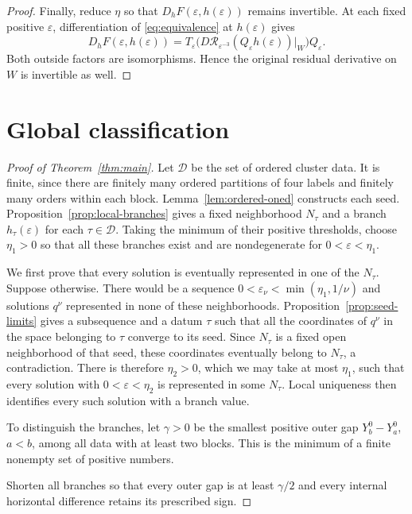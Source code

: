 \documentclass[11pt,a4paper]{amsart}
\numberwithin{equation}{section}
\newcommand{\eps}{\varepsilon}
\newcommand{\cR}{\mathcal R}
\newcommand{\cD}{\mathcal D}
\begin{document}
\begin{proof}
Finally, reduce $\eta$ so that $D_hF(\eps,h(\eps))$ remains invertible.
At each fixed positive $\eps$, differentiation of \eqref{eq:equivalence}
at $h(\eps)$ gives
\begin{equation}\label{eq:original-nondegeneracy}
 D_hF(\eps,h(\eps))
 =T_\eps\bigl(D\cR_{\eps^{-3}}(Q_\eps h(\eps))|_W\bigr)Q_\eps.
\end{equation}
Both outside factors are isomorphisms. Hence the original residual
derivative on $W$ is invertible as well.
\end{proof}

\section{Global classification}\label{sec:global}

\begin{proof}[Proof of Theorem~\ref{thm:main}]
Let $\cD$ be the set of ordered cluster data. It is finite, since there
are finitely many ordered partitions of four labels and finitely many
orders within each block. Lemma~\ref{lem:ordered-oned} constructs each
seed. Proposition~\ref{prop:local-branches} gives a fixed neighborhood
$N_\tau$ and a branch $h_\tau(\eps)$ for each $\tau\in\cD$.
Taking the minimum of their positive thresholds, choose $\eta_1>0$
so that all these branches exist and are nondegenerate for
$0<\eps<\eta_1$.

We first prove that every solution is eventually represented in one
of the $N_\tau$. Suppose otherwise. There would be a sequence
$0<\eps_\nu<\min(\eta_1,1/\nu)$ and solutions $q^\nu$ represented
in none of these neighborhoods. Proposition~\ref{prop:seed-limits}
gives a subsequence and a datum $\tau$ such that all the coordinates
of $q^\nu$ in the space belonging to $\tau$ converge to its seed.
Since $N_\tau$ is a fixed open neighborhood of that seed, these
coordinates eventually belong to $N_\tau$, a contradiction.
There is therefore $\eta_2>0$, which we may take at most $\eta_1$,
such that every solution with $0<\eps<\eta_2$ is represented in
some $N_\tau$. Local uniqueness then identifies every such solution with a branch value.

To distinguish the branches, let $\gamma>0$ be the smallest positive
outer gap $Y_b^0-Y_a^0$, $a<b$, among all data with at least two blocks.
This is the minimum of a finite nonempty set of positive numbers.

Shorten all branches so that every outer gap is at least $\gamma/2$
and every internal horizontal difference retains its prescribed sign.


\end{proof}
\end{document}
